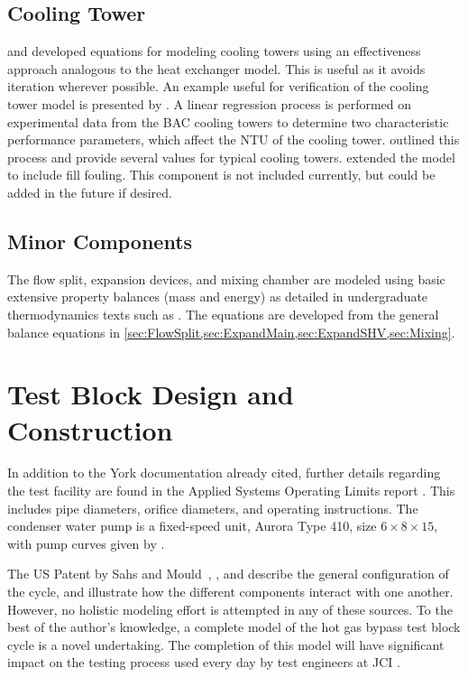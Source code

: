 \subsection{Cooling Tower}
\citet{braun1989} and \citet{mitchell2013} developed equations for modeling cooling towers 
using an effectiveness approach analogous to the heat exchanger model.
This is useful as it avoids iteration wherever possible. 
An example useful for verification of the cooling tower model 
is presented by \citet{mitchell2013}. 
A linear regression process is performed on experimental data from 
the BAC cooling towers \citep{CLTselect} to determine two characteristic performance parameters, 
which affect the NTU of the cooling tower. 
\citet{braun1989} outlined this process and provide several values 
for typical cooling towers. 
\citet{qureshi2006} extended the model to include fill fouling.
This component is not included currently, but could be added 
in the future if desired.

\subsection{Minor Components}
The flow split, expansion devices, and mixing chamber are modeled using 
basic extensive property balances (mass and energy) as detailed in 
undergraduate thermodynamics texts such as \citet{cengel2011}. 
The equations are developed from the general balance equations 
in \cref{sec:FlowSplit,sec:ExpandMain,sec:ExpandSHV,sec:Mixing}.

\section{Test Block Design and Construction}
In addition to the York documentation already cited, further details
regarding the test facility are found in the Applied Systems Operating Limits
report \citep{bluebook}. This includes pipe diameters, orifice diameters, and
operating instructions. The condenser water pump is a fixed-speed unit,
Aurora Type 410, size $6\times8\times15$, with pump curves given by
\citet{aurora2007}.

The US Patent by Sahs and Mould~\citep{sahs1956}, \citet{dirlea1996},
and \citet{mcgovern1984} describe the general configuration
of the cycle, and illustrate how the different components interact with one 
another.
However, no holistic modeling effort is attempted in any of these sources.
To the best of the author's knowledge, a complete model of the hot gas bypass
test block cycle is a novel undertaking.
The completion of this model will have significant impact on the testing process
used every day by test engineers at JCI \citep{sommer2013}.

